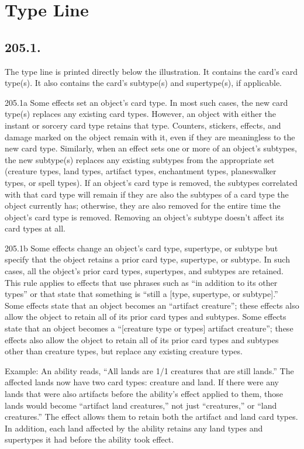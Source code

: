 \section{Type Line}
\subsection*{205.1.}
The type line is printed directly below the illustration. It contains the card’s card type(s). It also contains the card’s subtype(s) and supertype(s), if applicable.

205.1a Some effects set an object’s card type. In most such cases, the new card type(s) replaces any existing card types. However, an object with either the instant or sorcery card type retains that type. Counters, stickers, effects, and damage marked on the object remain with it, even if they are meaningless to the new card type. Similarly, when an effect sets one or more of an object’s subtypes, the new subtype(s) replaces any existing subtypes from the appropriate set (creature types, land types, artifact types, enchantment types, planeswalker types, or spell types). If an object’s card type is removed, the subtypes correlated with that card type will remain if they are also the subtypes of a card type the object currently has; otherwise, they are also removed for the entire time the object’s card type is removed. Removing an object’s subtype doesn’t affect its card types at all.

205.1b Some effects change an object’s card type, supertype, or subtype but specify that the object retains a prior card type, supertype, or subtype. In such cases, all the object’s prior card types, supertypes, and subtypes are retained. This rule applies to effects that use phrases such as “in addition to its other types” or that state that something is “still a [type, supertype, or subtype].” Some effects state that an object becomes an “artifact creature”; these effects also allow the object to retain all of its prior card types and subtypes. Some effects state that an object becomes a “[creature type or types] artifact creature”; these effects also allow the object to retain all of its prior card types and subtypes other than creature types, but replace any existing creature types.

Example: An ability reads, “All lands are 1/1 creatures that are still lands.” The affected lands now have two card types: creature and land. If there were any lands that were also artifacts before the ability’s effect applied to them, those lands would become “artifact land creatures,” not just “creatures,” or “land creatures.” The effect allows them to retain both the artifact and land card types. In addition, each land affected by the ability retains any land types and supertypes it had before the ability took effect.


